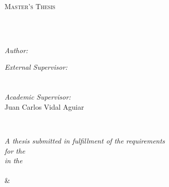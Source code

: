 \documentclass[11pt, english, singlespacing, liststotoc, toctotoc, chapterinoneline, parskip, headsepline]{MastersDoctoralThesis}
\author{Luis Ardévol Mesa} %
\begin{document}
\frontmatter %

\pagestyle{plain} %


\begin{titlepage}
\begin{center}

\vspace*{.06\textheight}
{\scshape\LARGE \textcolor{mdtRed}{\univname}\par}\vspace{1.5cm} %
\textsc{\Large Master's Thesis}\\[0.5cm] %

\HRule \\[0.4cm] 
{\huge \bfseries \ttitle\par}\vspace{0.4cm} %
\HRule \\[1.5cm]
 
\begin{minipage}[t]{0.4\textwidth}
\begin{flushleft} \large
\emph{Author:}\\
\textcolor{mdtRed}{\authorname} %
\end{flushleft}
\end{minipage}
\begin{minipage}[t]{0.4\textwidth}
\begin{flushright} \large
\emph{External Supervisor:} \\
\textcolor{mdtRed}{\supname} \\ %
\quad \\
\emph{Academic Supervisor:} \\
\textcolor{mdtRed}{Juan Carlos Vidal Aguiar} %
\end{flushright}
\end{minipage}\\
 
\vspace{3cm}

\large \textit{A thesis submitted in fulfillment of the requirements\\ for the \degreename}\\[0.3cm] %
\textit{in the}\\[0.4cm]
\textcolor{mdtRed}{\univname}\\\& \textcolor{mdtRed}{\deptname}\\ %
 

\end{center}
\end{titlepage}
\end{document}
